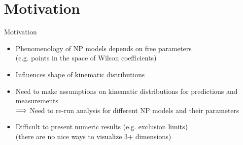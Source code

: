 \section{Motivation}
\begin{frame}{Motivation}
	\begin{itemize}
		\item Phenomenology of NP models depends on free parameters \\{\footnotesize(e.g. points in the space of Wilson coefficients)}
		\item Influences shape of kinematic distributions
	\end{itemize} 
	
	\bigskip
	\begin{itemize}
		\item Need to make assumptions on kinematic distributions for predictions and measurements\\
		$\Longrightarrow$ Need to re-run analysis for different NP models and their parameters
		\item Difficult to present numeric results (e.g. exclusion limits)\\
		{\footnotesize (there are no nice ways to visualize 3+ dimensions)}\\
	\end{itemize}
\end{frame}
%
